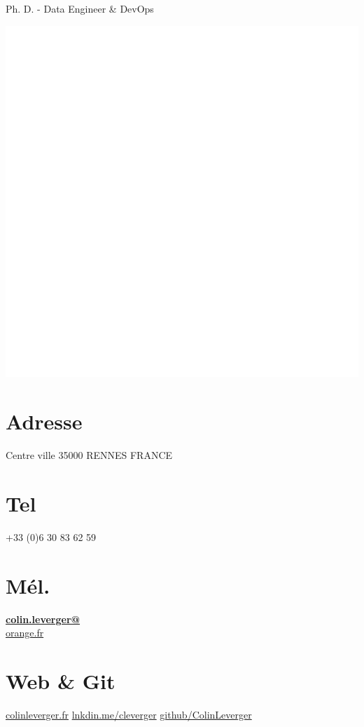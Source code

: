 \documentclass[]{friggeri-cv}
\begin{document}
      {Ph. D. - Data Engineer \& DevOps}


\begin{aside}
  \includegraphics[scale=0.01]{img/white.png}
  \section{Adresse}
    Centre ville 
    35000 RENNES 
    FRANCE
    ~
  \section{Tel}
    +33 (0)6 30 83 62 59 
    ~
  \section{Mél.}
    \href{mailto:colin.leverger@orange.fr}{\textbf{colin.leverger@}\\orange.fr}
  \section{Web \& Git}
    \href{http://www.colinleverger.fr}{colinleverger.fr}
    \href{https://www.linkedin.com/in/colinleverger}{lnkdin.me/cleverger}
    \href{https://github.com/ColinLeverger}{github/ColinLeverger}
    ~

\end{aside}
\end{document}
